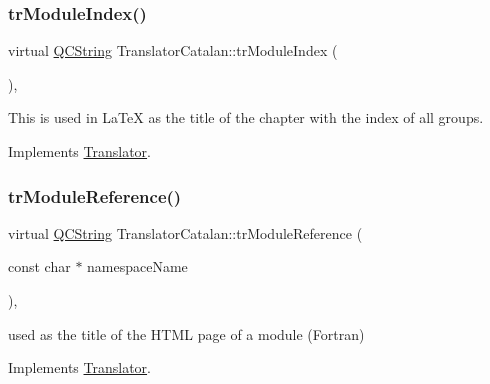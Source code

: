 \mbox{\label{class_translator_catalan_ab632d27e4553c34e28f916d591782b0b}} 
\subsubsection{\texorpdfstring{trModuleIndex()}{trModuleIndex()}}
{\footnotesize\ttfamily virtual \mbox{\hyperlink{class_q_c_string}{Q\+C\+String}} Translator\+Catalan\+::tr\+Module\+Index (\begin{DoxyParamCaption}{ }\end{DoxyParamCaption})\hspace{0.3cm}{\ttfamily [inline]}, {\ttfamily [virtual]}}

This is used in La\+TeX as the title of the chapter with the index of all groups. 

Implements \mbox{\hyperlink{class_translator}{Translator}}.

\mbox{\label{class_translator_catalan_ac4aedb1dc1b6d91533d719e4a5e3381c}} 
\subsubsection{\texorpdfstring{trModuleReference()}{trModuleReference()}}
{\footnotesize\ttfamily virtual \mbox{\hyperlink{class_q_c_string}{Q\+C\+String}} Translator\+Catalan\+::tr\+Module\+Reference (\begin{DoxyParamCaption}\item[{const char $\ast$}]{namespace\+Name }\end{DoxyParamCaption})\hspace{0.3cm}{\ttfamily [inline]}, {\ttfamily [virtual]}}

used as the title of the H\+T\+ML page of a module (Fortran) 

Implements \mbox{\hyperlink{class_translator}{Translator}}.

\mbox{\label{class_translator_catalan_ab97a7586580b119bd9e18ba81387137c}} 
